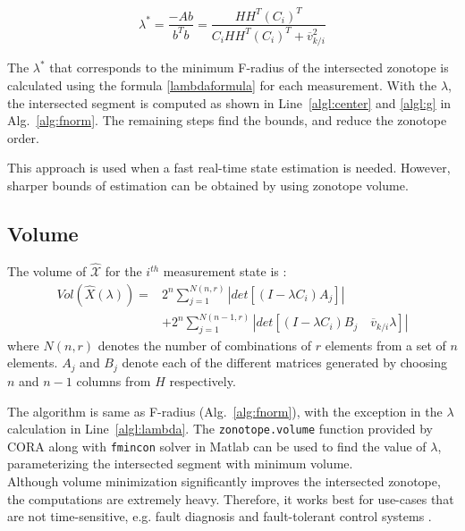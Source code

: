 \begin{equation}
\label{lambdaformula}
\lambda^* = \frac{-Ab }{b^Tb}  = \frac{HH^T(C_i)^T}{C_i HH^T(C_i)^T + \overline{v}_{k/i}^2} 
\end{equation}

The $\lambda^*$ that corresponds to the minimum F-radius of the intersected zonotope is calculated using the formula \eqref{lambdaformula} for each measurement. With the $\lambda$, the intersected segment is computed as shown in Line~\ref{algl:center} and \ref{algl:g} in Alg.~\ref{alg:fnorm}. The remaining steps find the bounds, and reduce the zonotope order. 

This approach is used when a fast real-time state estimation is needed. However, sharper bounds of estimation can be obtained by using zonotope volume.

\subsection{Volume}
The volume of $\mathcal{\hat{X}}$ for the $i^{th}$ measurement state is \cite{Alamo2005}:
\begin{equation}
\label{volumeformula}
\begin{split}
Vol(\hat{X}(\lambda))=& 2^n \sum^{N(n,r)}_{j=1} |det[(I - \lambda C_i)A_j]|\\
&+ 2^n \sum^{N(n-1,r)}_{j=1} |det[(I- \lambda C_i)B_j\quad \overline{v}_{k/i}\lambda]|
\end{split}
\end{equation}
where $N(n,r)$ denotes the number of combinations of $r$ elements from a set of $n$ elements. $A_j$ and $B_j$ denote each of the different matrices generated by choosing $n$ and $n-1$ columns from $H$ respectively. 

The algorithm is same as F-radius (Alg.~\ref{alg:fnorm}), with the exception in the $\lambda$ calculation in Line~\ref{algl:lambda}. The \texttt{zonotope.volume} function provided by CORA along with \texttt{fmincon} solver in Matlab\textsuperscript{\tiny\textregistered}  can be used to find the value of $\lambda$, parameterizing the intersected segment with minimum volume. \\
Although volume minimization significantly improves the intersected zonotope, the computations are extremely heavy. Therefore, it works best for use-cases that are not time-sensitive, e.g. fault diagnosis and fault-tolerant control systems \cite{Puig2010}. 

